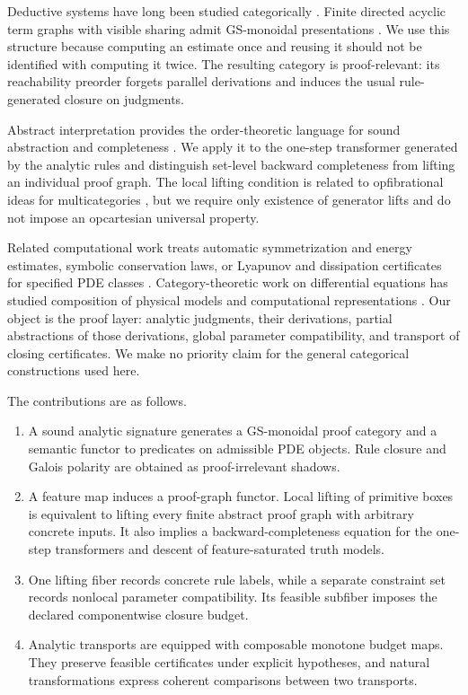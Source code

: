 \documentclass[10pt,journal,a4paper]{IEEEtran}
\theoremstyle{definition}
\begin{document}
Deductive systems have long been studied categorically \cite{Lambek1968,Meseguer1989}. Finite directed acyclic term graphs with visible sharing admit GS-monoidal presentations \cite{CorradiniGadducci1999,FritzLiang2023}. We use this structure because computing an estimate once and reusing it should not be identified with computing it twice. The resulting category is proof-relevant: its reachability preorder forgets parallel derivations and induces the usual rule-generated closure on judgments.

Abstract interpretation provides the order-theoretic language for sound abstraction and completeness \cite{CousotCousot1977,CousotCousot1979,GiacobazziRanzatoScozzari2000}. We apply it to the one-step transformer generated by the analytic rules and distinguish set-level backward completeness from lifting an individual proof graph. The local lifting condition is related to opfibrational ideas for multicategories \cite{Hermida2004}, but we require only existence of generator lifts and do not impose an opcartesian universal property.

Related computational work treats automatic symmetrization and energy estimates, symbolic conservation laws, or Lyapunov and dissipation certificates for specified PDE classes \cite{HagstromAppelo2007,Hereman2006,AhmadiValmorbidaPapachristodoulou2016,GahlawatValmorbida2020}. Category-theoretic work on differential equations has studied composition of physical models and computational representations \cite{PattersonBaasHosgoodFairbanks2023,MorrisEtAl2024}. Our object is the proof layer: analytic judgments, their derivations, partial abstractions of those derivations, global parameter compatibility, and transport of closing certificates. We make no priority claim for the general categorical constructions used here.

The contributions are as follows.
\begin{enumerate}[label=\emph{(\roman*)}]
  \item A sound analytic signature generates a GS-monoidal proof category and a semantic functor to predicates on admissible PDE objects. Rule closure and Galois polarity are obtained as proof-irrelevant shadows.
  \item A feature map induces a proof-graph functor. Local lifting of primitive boxes is equivalent to lifting every finite abstract proof graph with arbitrary concrete inputs. It also implies a backward-completeness equation for the one-step transformers and descent of feature-saturated truth models.
  \item One lifting fiber records concrete rule labels, while a separate constraint set records nonlocal parameter compatibility. Its feasible subfiber imposes the declared componentwise closure budget.
  \item Analytic transports are equipped with composable monotone budget maps. They preserve feasible certificates under explicit hypotheses, and natural transformations express coherent comparisons between two transports.
\end{enumerate}
\end{document}
